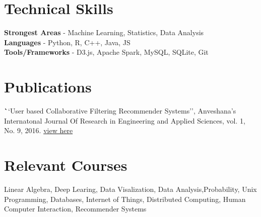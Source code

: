 \documentclass[margin, centered]{res}
\begin{document}
\begin{resume}
\section{Technical \hspace{2mm} Skills}
\textbf{Strongest Areas} - Machine Learning, Statistics, Data Analysis \\
\textbf{Languages} - Python, R, C++, Java, JS\\
\textbf{Tools/Frameworks} - D3.js, Apache Spark, MySQL, SQLite, Git


\section{Publications}
\textbf ``User based Collaborative Filtering Recommender Systems'', Anveshana's Internatonal Journal Of Research in Engineering and Applied Sciences, vol. 1, No. 9, 2016. \href{http://publications.anveshanaindia.com/wp-content/uploads/2016/09/USER-BASED-COLLABORATIVE-FILTERING-RECOMMENDER-SYSTEMS-1.pdf}{view here}

\section{Relevant \hspace{2mm} Courses}
Linear Algebra, Deep Learing, Data Visalization, Data Analysis,Probability, Unix Programming, Databases, Internet of Things, Distributed Computing, Human Computer Interaction, Recommender Systems 


\end{resume}
\end{document}
